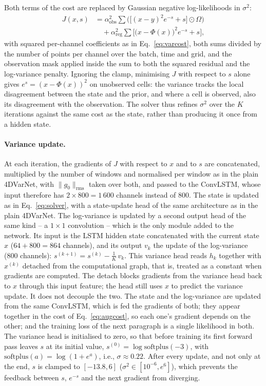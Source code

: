 \documentclass[english, 12pt, a4paper, elec, utf8, a-2b, online]{aaltothesis}
\begin{document}
Both terms of the cost are replaced by Gaussian negative log-likelihoods in
$\sigma^2$:
\begin{equation}
	\begin{aligned}
	J(x, s) &= \alpha_{\mathrm{obs}}^2 \sum \Big( \big[ (x - y)^2 e^{-s} + s \big] \odot \Omega \Big) \\
	        &\quad + \alpha_{\mathrm{reg}}^2 \sum \Big[ \big(x - \Phi(x)\big)^2 e^{-s} + s \Big],
	\end{aligned}
	\label{eq:augcost}
\end{equation}
with squared per-channel coefficients as in Eq.~\eqref{eq:varcost}, both sums divided by the number of points per channel over the batch, time and grid, and the observation mask applied
inside the sum to both the squared residual and the log-variance penalty.
Ignoring the clamp, minimising $J$ with respect to $s$ alone gives $e^{s} = (x - \Phi(x))^2$ on unobserved cells: the variance
tracks the local disagreement between the state and the prior, and where a cell
is observed, also its disagreement with the observation. The solver thus refines
$\sigma^2$ over the $K$ iterations against the same cost as the state, rather
than producing it once from a hidden state.

\paragraph{Variance update.}
At each iteration, the gradients of $J$ with respect to $x$ and to $s$ are
concatenated, multiplied by the number of windows and normalised per window as in
the plain 4DVarNet, with $\|g_0\|_{\mathrm{rms}}$ taken over both, and passed to the
ConvLSTM, whose input therefore has $2 \times 800 = 1\,600$ channels instead of 800. The state is
updated as in Eq.~\eqref{eq:solver}, with a state-update head of the same architecture as in the plain 4DVarNet. The log-variance is updated by a second output head of the same kind
-- a $1 \times 1$ convolution -- which is the only module added to the network.
Its input is the LSTM hidden state concatenated with the current state $x$
($64 + 800 = 864$ channels), and its output $v_k$ the update of the
log-variance (800 channels):
$s^{(k+1)} = s^{(k)} - \frac{1}{K}\, v_k$. This variance head reads $h_k$
together with $x^{(k)}$ detached from the computational graph, that is,
treated as a constant when gradients are computed. The detach
blocks gradients from the variance head back to $x$ through this input feature;
the head still uses $x$ to predict the variance update. It does not decouple the two. The
state and the log-variance are updated from the same ConvLSTM, which is fed the
gradients of both; they appear together in the cost of
Eq.~\eqref{eq:augcost}, so each one's gradient depends on the other; and the
training loss of the next paragraph is a single likelihood in both. The variance
head is initialised to zero, so that before training its first forward pass
leaves $s$ at its initial value, $s^{(0)} = \log \mathrm{softplus}(-3)$, with $\mathrm{softplus}(a) = \log(1 + e^{a})$,
i.e., $\sigma \approx 0.22$.
After every update, and not only at the end, $s$ is clamped to $[-13.8, 6]$
($\sigma^2 \in [10^{-6}, e^{6}]$), which prevents the feedback between $s$,
$e^{-s}$ and the next gradient from diverging.
\end{document}
